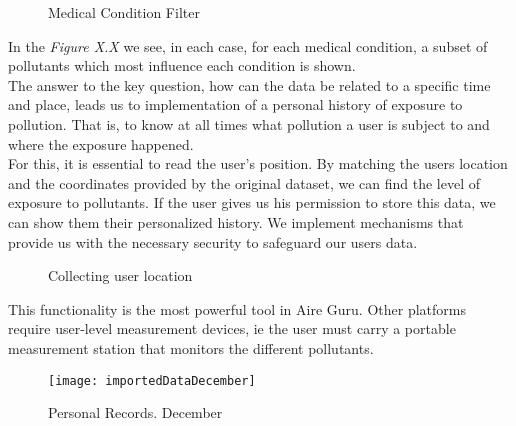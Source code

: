\begin{figure}[ht]
  \centering
  \hfill
  \hfill
  \caption{Medical Condition Filter}
\end{figure}

In the \textit{Figure X.X} we see, in each case, for each medical condition, a subset of pollutants which most influence each condition is shown.\\
  
The answer to the key question, how can the data be related to a specific time and place, leads us to
implementation of a personal history of exposure to pollution. That is, to know at all times what pollution
a user is subject to and where the exposure happened.\\

For this, it is essential to read the user's position. By matching the users location and the coordinates provided by the original dataset,
we can find the level of exposure to pollutants. If the user gives us his permission to store this data, we can show them their personalized history.
We implement mechanisms that provide us with the necessary security to safeguard our users data.\\

\begin{figure}[ht]
  \centering 
  \caption{Collecting user location}
\end{figure}

This functionality is the most powerful tool in Aire Guru. Other platforms require user-level measurement devices, ie the user must carry
a portable measurement station that monitors the different pollutants.\\

\begin{figure}[ht]
  \centering
  \texttt{[image: importedDataDecember]}
  \caption{Personal Records. December}
\end{figure}

